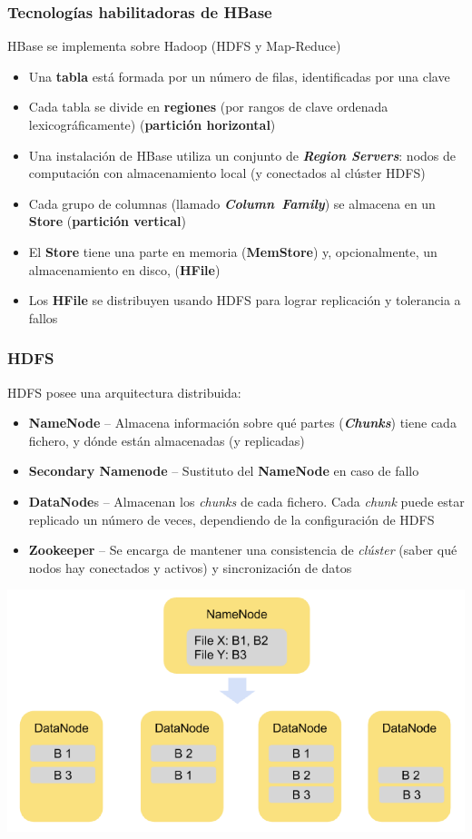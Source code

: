 \documentclass[14pt]{beamer}
\begin{document}
\begin{frame}
  \frametitle{Tecnologías habilitadoras de HBase}
HBase se implementa sobre Hadoop (HDFS y Map-Reduce)
\begin{itemize}
\item Una {\bf tabla} está formada por un número de filas, identificadas
  por una clave
\item Cada tabla se divide en {\bf regiones} (por rangos de clave ordenada
  lexicográficamente) ({\bf partición horizontal})
\item Una instalación de HBase utiliza un conjunto de {\bfseries\itshape
    Region Servers}: nodos de computación con almacenamiento local (y
  conectados al clúster HDFS)
\item Cada grupo de columnas (llamado {\bfseries\itshape Column~Family\/})
  se almacena en un {\bf Store} ({\bf partición vertical})
\item El {\bf Store} tiene una parte en memoria ({\bf MemStore}) y,
  opcionalmente, un almacenamiento en disco, ({\bf HFile})
\item Los {\bf HFile} se distribuyen usando HDFS para lograr replicación y
  tolerancia a fallos
\end{itemize}
\end{frame}

\begin{frame}[allowframebreaks]
  \frametitle{HDFS}
HDFS posee una arquitectura distribuida:
    \begin{itemize}
    \item {\bf NameNode} -- Almacena información sobre qué partes
      ({\bfseries\itshape Chunks}) tiene cada fichero, y dónde están
      almacenadas (y replicadas)
    \item {\bf Secondary Namenode} -- Sustituto del {\bf NameNode} en caso
      de fallo
    \item {\bf DataNode}s -- Almacenan los {\em chunks\/} de cada fichero.
      Cada {\em chunk} puede estar replicado un número de veces,
      dependiendo de la configuración de HDFS
    \item {\bf Zookeeper} -- Se encarga de mantener una consistencia de
      {\em clúster} (saber qué nodos hay conectados y activos) y
      sincronización de datos
    \end{itemize}
  \includegraphics[width=\textwidth]{img/hdfs1}
\end{frame}
\end{document}
